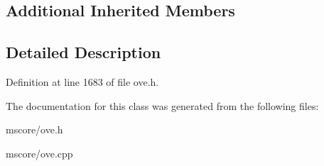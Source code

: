 \subsection*{Additional Inherited Members}


\subsection{Detailed Description}


Definition at line 1683 of file ove.\+h.



The documentation for this class was generated from the following files\+:\begin{DoxyCompactItemize}
\item 
mscore/ove.\+h\item 
mscore/ove.\+cpp\end{DoxyCompactItemize}
